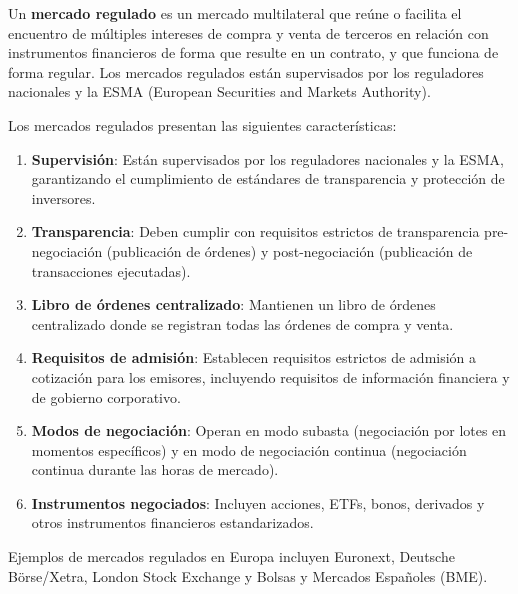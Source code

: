 \begin{definicion}
Un \textbf{mercado regulado} es un mercado multilateral que reúne o facilita el encuentro de múltiples intereses de compra y venta de terceros en relación con instrumentos financieros de forma que resulte en un contrato, y que funciona de forma regular. Los mercados regulados están supervisados por los reguladores nacionales y la ESMA (European Securities and Markets Authority).
\end{definicion}

\begin{teorema}
Los mercados regulados presentan las siguientes características:

\begin{enumerate}
\item \textbf{Supervisión}: Están supervisados por los reguladores nacionales y la ESMA, garantizando el cumplimiento de estándares de transparencia y protección de inversores.

\item \textbf{Transparencia}: Deben cumplir con requisitos estrictos de transparencia pre-negociación (publicación de órdenes) y post-negociación (publicación de transacciones ejecutadas).

\item \textbf{Libro de órdenes centralizado}: Mantienen un libro de órdenes centralizado donde se registran todas las órdenes de compra y venta.

\item \textbf{Requisitos de admisión}: Establecen requisitos estrictos de admisión a cotización para los emisores, incluyendo requisitos de información financiera y de gobierno corporativo.

\item \textbf{Modos de negociación}: Operan en modo subasta (negociación por lotes en momentos específicos) y en modo de negociación continua (negociación continua durante las horas de mercado).

\item \textbf{Instrumentos negociados}: Incluyen acciones, ETFs, bonos, derivados y otros instrumentos financieros estandarizados.
\end{enumerate}
\end{teorema}

Ejemplos de mercados regulados en Europa incluyen Euronext, Deutsche Börse/Xetra, London Stock Exchange y Bolsas y Mercados Españoles (BME).

